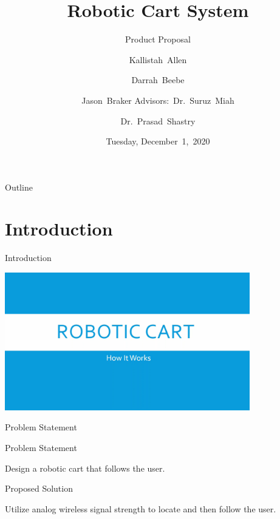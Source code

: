 \documentclass{beamer}
\title[Robotic Cart System (Proposal)]{Robotic Cart System}
\subtitle{Product Proposal}
\author[K.~Allen, D.~Beebe, J.~Braker]{Kallistah~Allen \and Darrah~Beebe \and
Jason~Braker
Advisors:~Dr.~Suruz~Miah \and Dr.~Prasad~Shastry}
\institute[Bradley University] %
{
  Department of Electrical and Computer Engineering\\
  Bradley University\\
  1501 W. Bradley Avenue\\
  Peoria, IL, 61625, USA
}
\date[December~1,~2020]{Tuesday, December~1,~2020}
\begin{document}
\begin{frame}
  \titlepage
\end{frame}

\begin{frame}{Outline} 
  \tableofcontents%
\end{frame}

\section{Introduction}

\begin{frame}{Introduction}
  \begin{center}
    \href{videos/proposalVideo.mp4}{\includegraphics[width=0.8\textwidth]{figs/img/proposalVideoTitle}}
  \end{center}
\end{frame}

\begin{frame}{Problem Statement}
  \begin{block}{Problem Statement}
    \begin{LARGE}
      Design a robotic cart that follows the user.
    \end{LARGE}
  \end{block}
  \pause
  \begin{block}{Proposed Solution}
    \begin{LARGE}
      Utilize analog wireless signal strength to locate and then follow the user.
    \end{LARGE}
  \end{block}
\end{frame}
\end{document}
